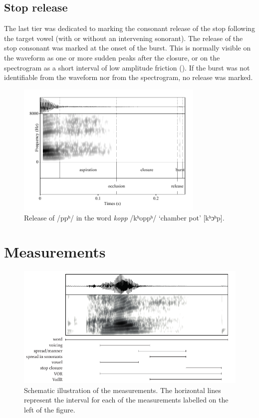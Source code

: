 \documentclass[11pt,a4paper,openany]{memoir}\usepackage[]{graphicx}\usepackage[]{color}
\begin{document}
\subsection{Stop release}
The last tier was dedicated to marking the consonant release of the stop following the target vowel (with or without an intervening sonorant).
The release of the stop consonant was marked at the onset of the burst.
This is normally visible on the waveform as one or more sudden peaks after the closure, or on the spectrogram as a short interval of low amplitude friction ().
If the burst was not identifiable from the waveform nor from the spectrogram, no release was marked.

\begin{figure}
\centering
\includegraphics[width=0.8\textwidth]{kopp}
\caption[Release of /ppʰ/]{Release of /ppʰ/ in the word \textit{kopp} /kʰoppʰ/ `chamber pot' [kʰɔʰp].}
\label{f:release}
\end{figure}

\section{Measurements}
\label{s:measurements}

\begin{figure}
\centering
\includegraphics[width=\linewidth]{../img/measures}
\caption[Schematic illustration of the measurements]{Schematic illustration of the measurements.
The horizontal lines represent the interval for each of the measurements labelled on the left of the figure.
}
\label{f:measures}
\end{figure}
\end{document}
